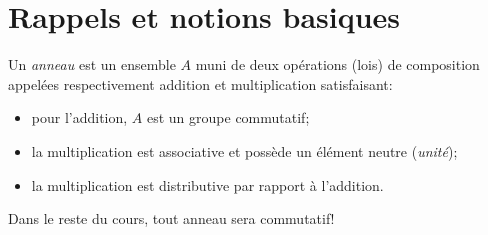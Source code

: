 
\chapter{Rappels et notions basiques}


\begin{defi}
  Un \emph{anneau} est un ensemble $A$ muni de deux opérations (lois) de composition appelées respectivement
  addition et multiplication satisfaisant:
  \begin{itemize}
  \item pour l'addition, $A$ est un groupe commutatif;
  \item la multiplication est associative et possède un élément neutre (\emph{unité});
  \item la multiplication est distributive par rapport à l'addition.
  \end{itemize}

\end{defi}

Dans le reste du cours, tout anneau sera commutatif!

